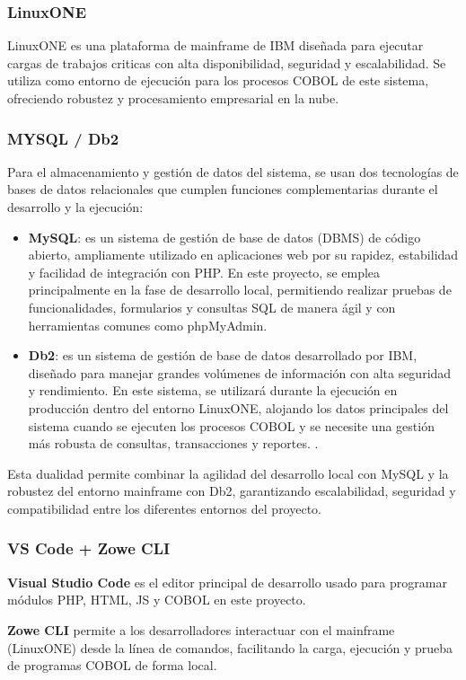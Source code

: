\documentclass[twoside]{article}
\begin{document}
\subsubsection{LinuxONE}
LinuxONE es una plataforma de mainframe de IBM diseñada para ejecutar cargas de trabajos criticas con alta disponibilidad, seguridad y escalabilidad. Se utiliza como entorno de ejecución para los procesos COBOL de este sistema, ofreciendo robustez y procesamiento empresarial en la nube. \cite{ibmLinuxONE}

\subsubsection{MYSQL / Db2}
Para el almacenamiento y gestión de datos del sistema, se usan dos tecnologías de bases de datos relacionales que cumplen funciones complementarias durante el desarrollo y la ejecución:
\begin{itemize}
    \item \textbf{MySQL}: es un sistema de gestión de base de datos (DBMS) de código abierto, ampliamente utilizado en aplicaciones web por su rapidez, estabilidad y facilidad de integración con PHP. En este proyecto, se emplea principalmente en la fase de desarrollo local, permitiendo realizar pruebas de funcionalidades, formularios y consultas SQL de manera ágil y con herramientas comunes como phpMyAdmin. \cite{mysqlMySQL}
    \item \textbf{Db2}: es un sistema de gestión de base de datos desarrollado por IBM, diseñado para manejar grandes volúmenes de información con alta seguridad y rendimiento. En este sistema, se utilizará durante la ejecución en producción dentro del entorno LinuxONE, alojando los datos principales del sistema cuando se ejecuten los procesos COBOL y se necesite una gestión más robusta de consultas, transacciones y reportes. \cite{ibmProgramacixF3nPara}.
\end{itemize}
Esta dualidad permite combinar la agilidad del desarrollo local con MySQL y la robustez del entorno mainframe con Db2, garantizando escalabilidad, seguridad y compatibilidad entre los diferentes entornos del proyecto.

\subsubsection{VS Code + Zowe CLI}
\textbf{Visual Studio Code} es el editor principal de desarrollo usado para programar módulos PHP, HTML, JS y COBOL en este proyecto.\cite{visualstudioBuildVisual} \par
\textbf{Zowe CLI }permite a los desarrolladores interactuar con el mainframe (LinuxONE) desde la línea de comandos, facilitando la carga, ejecución y prueba de programas COBOL de forma local. \cite{zoweDocs}
\end{document}
